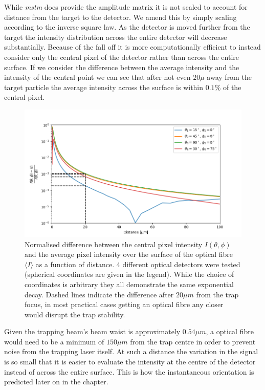While \textit{mstm} does provide the amplitude matrix it is not
scaled to account for distance from the target to the detector.
We amend this by simply scaling according to the inverse square 
law. As the detector is moved further from the target the 
intensity distribution across the entire detector will decrease
substantially. Because of the fall off it is more computationally
efficient to instead consider only the central pixel of the 
detector rather than across the entire surface. If we consider 
the difference between the average intensity and the intensity 
of the central point we can see that after not even $20 \mu$ 
away from the target particle the average intensity across the 
surface is within $0.1\%$ of the central pixel. 
\begin{figure}[h!]
	\centering
	\includegraphics[width=\linewidth]{fall_off_with_distance.png}
	\caption{Normalised difference between the central pixel intensity
	$I(\theta, \phi)$ and the average pixel intensity over the surface
	of the optical fibre $\langle I \rangle$ as a function of distance.
	4 different optical detectors were tested (spherical coordinates 
	are given in the legend). While the choice of coordinates is 
	arbitrary they all demonstrate the same exponential decay. Dashed
	lines indicate the difference after $20\mu m$ from the trap focus,
	in most practical cases getting an optical fibre any closer would
	disrupt the trap stability.}
\end{figure}

Given the trapping beam's beam waist is approximately $0.54 \mu m$,
a optical fibre would need to be a minimum of $150 \mu m$ from the 
trap centre in order to prevent noise from the trapping laser itself.
At such a distance the variation in the signal is so small that it is 
easier to evaluate the intensity at the centre of the detector instead
of across the entire surface. This is how the instantaneous orientation
is predicted later on in the chapter.

